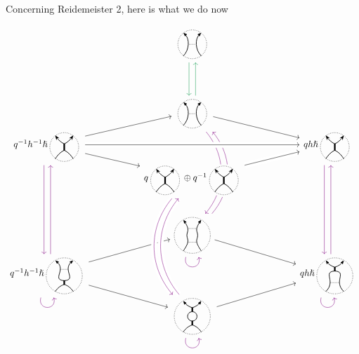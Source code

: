 \documentclass{article}
\theoremstyle{plain} %
\theoremstyle{definition} %
\theoremstyle{remark} %
\begin{document}
Concerning Reidemeister 2, here is what we do now

\[\label{r2asdr}
\begin{tikzcd}[row sep=-0.1cm, column sep=2cm]
&
\scalebox{0.7}{\ThinEdge{}{}{}{}}
\arrow[d, color=ForestGreen, shift right=1.5]
&
\\[4em]&
\scalebox{0.7}{\ThinEdge{}{}{}{}}
\arrow[dr]
\arrow[ddd, bend left=40, color=violet, shift right=1.5, dash pattern=on 40pt off 35pt]
\arrow[leftarrow, ddd, bend left=40, color=violet, shift left=1.5, dash pattern=on 39.5pt off 37pt]
\arrow[u, color=ForestGreen, shift right=1.5]
&
\\
q^{-1}h^{-1}\hslash\scalebox{0.7}{\ThickEdge{}{}{}{}} 
\arrow[dr]
\arrow[ur]
\arrow[ddd, color=violet, shift right=1.5]
&
&
qh\hslash\scalebox{0.7}{\ThickEdge{}{}{}{}}
\arrow[ddd, color=violet, shift right=1.5]
\\
& 
q\scalebox{0.7}{\ThickEdge{}{}{}{}}\oplus q^{-1}\scalebox{0.7}{\ThickEdge{}{}{}{}}
\arrow[ur, crossing over] 
&
\\[2em]
& 
\scalebox{0.7}{\ThinThin{}{}{}{}{}}
\arrow[loop right, distance=1.5em, in=-75, out=-105, color=violet]
\arrow[dr]
&
\\
q^{-1}h^{-1}\hslash\scalebox{0.7}{\ThinThick{}{}{}{}{}} 
\arrow[loop right, distance=1.5em, in=-75, out=-105, color=violet]
\arrow[ur]
\arrow[dr]
\arrow[uuu, color=violet, shift right=1.5]
&& 
qh\hslash\scalebox{0.7}{\ThickThin{}{}{}{}{}}
\arrow[uuu, color=violet, shift right=1.5]
\arrow[loop right, distance=1.5em, in=-75, out=-105, color=violet]
\\
& 
\scalebox{0.7}{\Bigon{}{}{}{}{}} 
\arrow[ur]
\arrow[loop right, distance=1.5em, in=-75, out=-105, color=violet] 
&
\arrow[ddd, from=4-2, to=7-2, bend right=40, crossing over, color=violet, shift right=1.5] 
\arrow[uuu, from=7-2, to=4-2, bend left=40, crossing over, color=violet, shift right=1.5] 
\arrow[ur, from=4-2, to=3-3, crossing over] 
\arrow[rr, from=3-1, to=3-3, crossing over] 
\end{tikzcd}
\]
\end{document}
